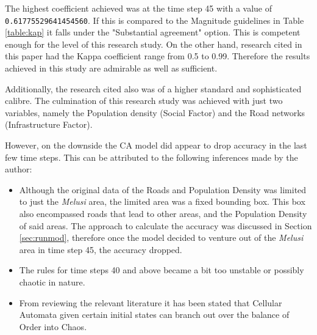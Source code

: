 The highest coefficient achieved was at the time step 45 with a value of \texttt{0.61775529641454560}. If this is compared to the Magnitude guidelines in Table \ref{table:kap} it falls under the "Substantial agreement" option. This is competent enough for the level of this research study. On the other hand, research cited in this paper had the Kappa coefficient range from 0.5 to 0.99. Therefore the results achieved in this study are admirable as well as sufficient.

Additionally, the research cited also was of a higher standard and sophisticated calibre. The culmination of this research study was achieved with just two variables, namely the Population density (Social Factor) and the Road networks (Infrastructure Factor).

However, on the downside the CA model did appear to drop accuracy in the last few time steps. This can be attributed to the following inferences made by the author:
\begin{itemize}
\item Although the original data of the Roads and Population Density was limited to just the \textit{Melusi} area, the limited area was a fixed bounding box. This box also encompassed roads that lead to other areas, and the Population Density of said areas. The approach to calculate the accuracy was discussed in Section \ref{sec:runmod}, therefore once the model decided to venture out of the \textit{Melusi} area in time step 45, the accuracy dropped.
\item The rules for time steps 40 and above became a bit too unstable or possibly chaotic in nature.
\item From reviewing the relevant literature it has been stated that Cellular Automata given certain initial states can branch out over the balance of Order into Chaos.
\end{itemize}
